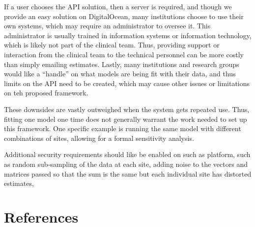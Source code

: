 \documentclass[]{elsarticle} %
\begin{document}
If a user chooses the API solution, then a server is required, and
though we provide an easy solution on DigitalOcean, many institutions
choose to use their own systems, which may require an administrator to
oversee it. This administrator is usually trained in information systems
or information technology, which is likely not part of the clinical
team. Thus, providing support or interaction from the clinical team to
the technical personnel can be more costly than simply emailing
estimates. Lastly, many institutions and research groups would like a
``handle'' on what models are being fit with their data, and thus limits
on the API need to be created, which may cause other issues or
limitations on teh proposed framework.

These downsides are vastly outweighed when the system gets repeated use.
Thus, fitting one model one time does not generally warrant the work
needed to set up this framework. One specific example is running the
same model with different combinations of sites, allowing for a formal
sensitivity analysis.

Additional security requirements should like be enabled on such as
platform, such as random sub-sampling of the data at each site, adding
noise to the vectors and matrices passed so that the sum is the same but
each individual site has distorted estimates,

\hypertarget{references}{%
\section*{References}\label{references}}
\end{document}
